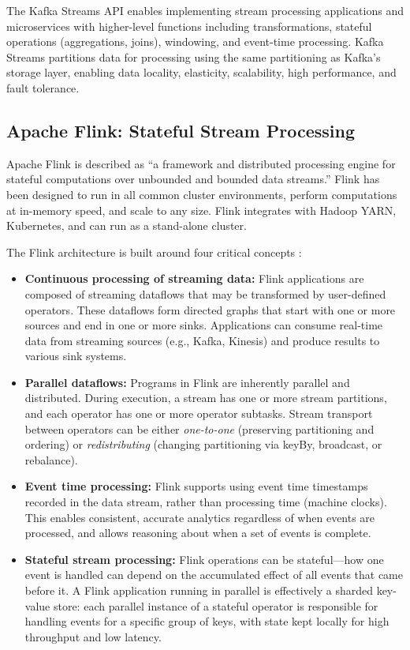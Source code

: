 The Kafka Streams API \citep{kafkastreams2024} enables implementing stream processing applications and microservices with higher-level functions including transformations, stateful operations (aggregations, joins), windowing, and event-time processing. Kafka Streams partitions data for processing using the same partitioning as Kafka's storage layer, enabling data locality, elasticity, scalability, high performance, and fault tolerance.

\subsection{Apache Flink: Stateful Stream Processing}

Apache Flink \citep{flinkdocs2024} is described as ``a framework and distributed processing engine for stateful computations over unbounded and bounded data streams.'' Flink has been designed to run in all common cluster environments, perform computations at in-memory speed, and scale to any size. Flink integrates with Hadoop YARN, Kubernetes, and can run as a stand-alone cluster.

The Flink architecture is built around four critical concepts \citep{flinkdocs2024}:

\begin{itemize}
    \item \textbf{Continuous processing of streaming data:} Flink applications are composed of streaming dataflows that may be transformed by user-defined operators. These dataflows form directed graphs that start with one or more sources and end in one or more sinks. Applications can consume real-time data from streaming sources (e.g., Kafka, Kinesis) and produce results to various sink systems.
    \item \textbf{Parallel dataflows:} Programs in Flink are inherently parallel and distributed. During execution, a stream has one or more stream partitions, and each operator has one or more operator subtasks. Stream transport between operators can be either \textit{one-to-one} (preserving partitioning and ordering) or \textit{redistributing} (changing partitioning via keyBy, broadcast, or rebalance).
    \item \textbf{Event time processing:} Flink supports using event time timestamps recorded in the data stream, rather than processing time (machine clocks). This enables consistent, accurate analytics regardless of when events are processed, and allows reasoning about when a set of events is complete.
    \item \textbf{Stateful stream processing:} Flink operations can be stateful---how one event is handled can depend on the accumulated effect of all events that came before it. A Flink application running in parallel is effectively a sharded key-value store: each parallel instance of a stateful operator is responsible for handling events for a specific group of keys, with state kept locally for high throughput and low latency.
\end{itemize}


